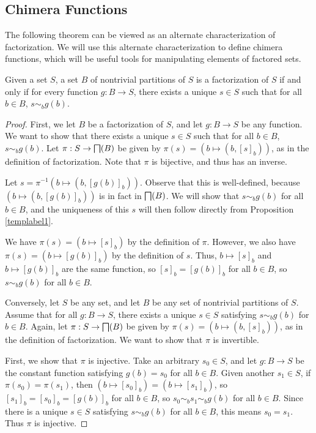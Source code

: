 \documentclass[authordate,onecolumn]{miri-tech-article}
\begin{document}
\subsection{Chimera Functions}
The following theorem can be viewed as an alternate characterization of factorization. We will use this alternate characterization to define chimera functions, which will be useful tools for manipulating elements of factored sets.
\begin{theorem}\label{templabel2}
Given a set $S$, a set $B$ of nontrivial partitions of $S$ is a factorization of $S$ if and only if for every function $g:B\rightarrow S$, there exists a unique $s\in S$ such that for all $b\in B$, $s\sim_b g(b)$.
\end{theorem}
\begin{proof}
First, we let $B$ be a factorization of $S$, and let $g:B\rightarrow S$ be any function. We want to show that there exists a unique $s\in S$ such that for all $b\in B$, $s\sim_b g(b)$. Let $\pi:S\rightarrow \bigsqcap(B)$ be given by $\pi(s)=(b\mapsto(b,[s]_b))$, as in the definition of factorization. Note that $\pi$ is bijective, and thus has an inverse.

Let $s=\pi^{-1}(b\mapsto (b,[g(b)]_b))$. Observe that this is well-defined, because $(b\mapsto (b,[g(b)]_b))$ is in fact in $\bigsqcap(B)$. We will show that $s\sim_b g(b)$ for all $b\in B$, and the uniqueness of this $s$ will then follow directly from Proposition \ref{templabel1}. 

We have $\pi(s)=(b\mapsto[s]_b)$ by the definition of $\pi$. However, we also have $\pi(s)=(b\mapsto[g(b)]_b)$ by the definition of $s$. Thus, $b\mapsto[s]_b$ and $b\mapsto[g(b)]_b$ are the same function, so $[s]_b=[g(b)]_b$ for all $b\in B$, so $s\sim_b g(b)$ for all $b\in B$.

Conversely, let $S$ be any set, and let $B$ be any set of nontrivial partitions of $S$. Assume that for all $g:B\rightarrow S$, there exists a unique $s\in S$ satisfying $s\sim_b g(b)$ for $b\in B$. Again, let $\pi:S\rightarrow \bigsqcap(B)$ be given by $\pi(s)=(b\mapsto(b,[s]_b))$, as in the definition of factorization. We want to show that $\pi$ is invertible.

First, we show that $\pi$ is injective. Take an arbitrary $s_0\in S$, and let $g:B\rightarrow S$ be the constant function satisfying $g(b)=s_0$ for all $b\in B$. Given another $s_1\in S$, if $\pi(s_0)=\pi(s_1)$, then $(b\mapsto[s_0]_b)=(b\mapsto[s_1]_b)$, so $[s_1]_b=[s_0]_b=[g(b)]_b$ for all $b\in B$, so $s_0\sim_b s_1\sim_b g(b)$ for all $b\in B$. Since there is a unique $s\in S$ satisfying $s\sim_b g(b)$ for all $b\in B$, this means $s_0=s_1$. Thus $\pi$ is injective.


\end{proof}
\end{document}
